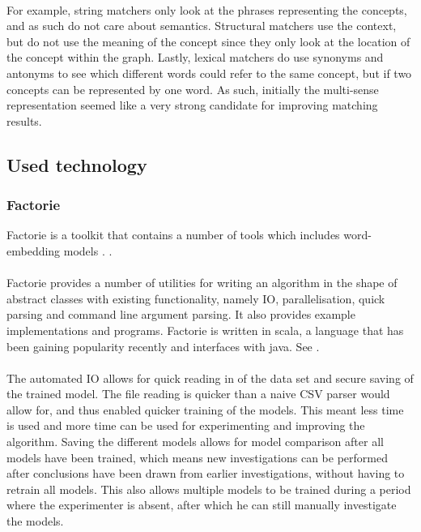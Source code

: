\documentclass{article}
\begin{document}
 \paragraph{}
 For example, string matchers only look at the phrases representing the concepts, and as such do not care about semantics. Structural matchers use the context, but do not use the meaning of the concept since they only look at the location of the concept within the graph. Lastly, lexical matchers do use synonyms and antonyms to see which different words could refer to the same concept, but if two concepts can be represented by one word. As such, initially the multi-sense representation seemed like a very strong candidate for improving matching results.
 
 \subsection{Used technology}
 \subsubsection{Factorie} \label{factorie}
 Factorie is a toolkit that contains a number of tools which includes word-embedding models \cite{git-factorie}. \cite{w2v}.
 \paragraph{}
 Factorie provides a number of utilities for writing an algorithm in the shape of abstract classes with existing functionality, namely IO, parallelisation, quick parsing and command line argument parsing. It also provides example implementations and programs. Factorie is written in scala, a language that has been gaining popularity recently and interfaces with java. See \cite{scala}. 
 \paragraph{}
 The automated IO allows for quick reading in of the data set and secure saving of the trained model. The file reading is quicker than a naive CSV parser would allow for, and thus enabled quicker training of the models. This meant less time is used and more time can be used for experimenting and improving the algorithm. Saving the different models allows for model comparison after all models have been trained, which means new investigations can be performed after conclusions have been drawn from earlier investigations, without having to retrain all models. This also allows multiple models to be trained during a period where the experimenter is absent, after which he can still manually investigate the models.
\end{document}
